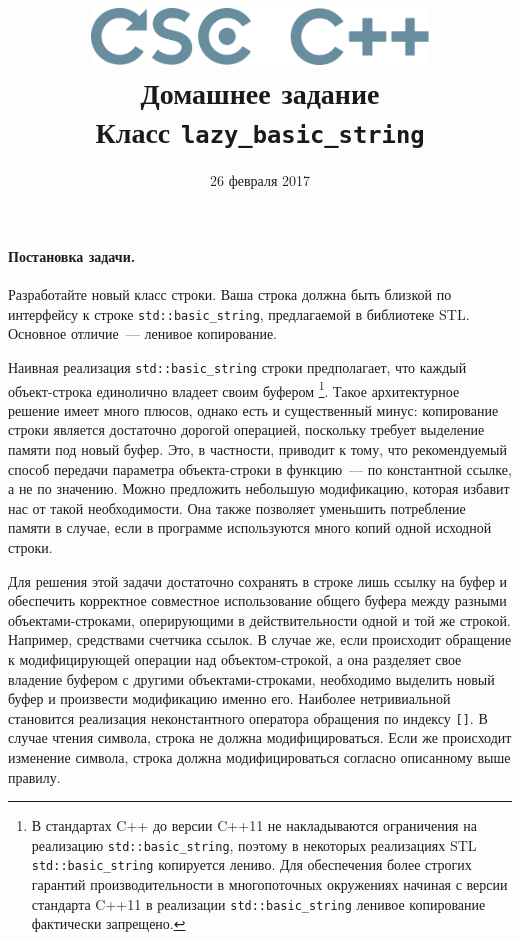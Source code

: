 \documentclass[a4paper,10pt]{article}
\begin{document}

\lstset{
  basicstyle=\ttfamily,
  columns=fullflexible
}

\newcommand{\cpp}[1]{{\tt #1}}

\title{\includegraphics[height=15mm]{../CSCCPP}\\[1em]
Домашнее задание  \\ Класс \cpp{lazy\_basic\_string}}
\preauthor{}
\author{}
\postauthor{}
\date{26 февраля 2017}

\maketitle

\paragraph{Постановка задачи.}

Разработайте новый класс строки.
Ваша строка должна быть близкой по интерфейсу к строке \cpp{std::basic\_string},
предлагаемой в библиотеке STL.
Основное отличие~--- ленивое копирование.

Наивная реализация \cpp{std::basic\_string} строки предполагает,
что каждый объект-строка единолично владеет своим буфером%
\footnote{В стандартах C++ до версии C++11 не накладываются ограничения на реализацию \cpp{std::basic\_string}, поэтому в некоторых реализациях STL \cpp{std::basic\_string} копируется лениво. Для обеспечения более строгих гарантий производительности в многопоточных окружениях начиная с версии стандарта C++11 в реализации \cpp{std::basic\_string} ленивое копирование фактически запрещено.}.
Такое архитектурное решение имеет много плюсов,
однако есть и существенный минус:
копирование строки является достаточно дорогой операцией,
поскольку требует выделение памяти под новый буфер.
Это, в частности, приводит к тому, что рекомендуемый способ передачи параметра объекта-строки в функцию~--- по константной ссылке,
а не по значению.
Можно предложить небольшую модификацию, которая избавит нас от такой необходимости.
Она также позволяет уменьшить потребление памяти в случае,
если в программе используются много копий одной исходной строки.

Для решения этой задачи достаточно сохранять в строке лишь ссылку на буфер и
обеспечить корректное совместное использование общего буфера между разными объектами-строками,
оперирующими в действительности одной и той же строкой. Например, средствами счетчика ссылок.
В случае же, если происходит обращение к модифицирующей операции над объектом-строкой,
а она разделяет свое владение буфером с другими объектами-строками,
необходимо выделить новый буфер и произвести модификацию именно его.
Наиболее нетривиальной становится реализация неконстантного оператора обращения по
индексу \cpp{[]}.
В случае чтения символа, строка не должна модифицироваться.
Если же происходит изменение символа,
строка должна модифицироваться согласно описанному выше правилу.
\end{document}

